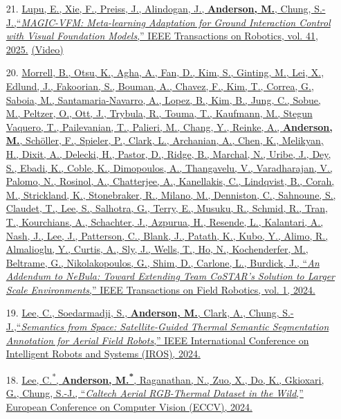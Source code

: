 \documentclass[12pt,letter,sans]{moderncv}
\begin{document}
\begin{itemize}

	\item [21.] \href{https://arxiv.org/pdf/2407.12304}
	{Lupu, E., Xie, F., Preiss, J., Alindogan, J.,  \underline{\textbf{Anderson, M.}}, Chung, S.-J.,``\textit{MAGIC-VFM: Meta-learning Adaptation for Ground Interaction Control with Visual Foundation Models},'' IEEE Transactions on Robotics, vol. 41, 2025.}
	\href{https://www.youtube.com/watch?v=sxM73ryweRA}{(Video)}

    \item [20.] \href{https://ieeexplore.ieee.org/document/10643435}
    {Morrell, B., Otsu, K., Agha, A., Fan, D., Kim, S., Ginting, M., Lei, X., Edlund, J., Fakoorian, S., Bouman, A., Chavez, F., Kim, T., Correa, G., Saboia, M., Santamaria-Navarro, A., Lopez, B., Kim, B., Jung, C., Sobue, M., Peltzer, O., Ott, J., Trybula, R., Touma, T., Kaufmann, M., Stegun Vaquero, T., Pailevanian, T., Palieri, M., Chang, Y., Reinke, A., \underline{\textbf{Anderson, M.}}, Sch\"{o}ller, F., Spieler, P., Clark, L., Archanian, A., Chen, K., Melikyan, H., Dixit, A., Delecki, H., Pastor, D., Ridge, B., Marchal, N., Uribe, J., Dey, S., Ebadi, K., Coble, K., Dimopoulos, A., Thangavelu, V., Varadharajan, V., Palomo, N., Rosinol, A., Chatterjee, A., Kanellakis, C., Lindqvist, B., Corah, M., Strickland, K., Stonebraker, R., Milano, M., Denniston, C., Sahnoune, S., Claudet, T., Lee, S., Salhotra, G., Terry, E., Musuku, R., Schmid, R., Tran, T., Kourchians, A., Schachter, J., Azpurua, H., Resende, L., Kalantari, A., Nash, J., Lee, J., Patterson, C., Blank, J., Patath, K., Kubo, Y., Alimo, R., Almalioglu, Y., Curtis, A., Sly, J., Wells, T., Ho, N., Kochenderfer, M., Beltrame, G., Nikolakopoulos, G., Shim, D., Carlone, L., Burdick, J., ``\textit{An Addendum to NeBula: Toward Extending Team CoSTAR's Solution to Larger Scale Environments},'' IEEE Transactions on Field Robotics, vol. 1, 2024.}
    
	\item [19.] \href{https://arxiv.org/pdf/2403.14056}
	{Lee, C., Soedarmadji, S.,  \underline{\textbf{Anderson, M.}}, Clark, A., Chung, S.-J.,``\textit{Semantics from Space: Satellite-Guided Thermal Semantic Segmentation Annotation for Aerial Field Robots},'' IEEE International Conference on Intelligent Robots and Systems (IROS), 2024.}

	\item [18.] \href{https://arxiv.org/pdf/2403.08997}
	{Lee, C.\textsuperscript{*}, \underline{\textbf{Anderson, M.\textsuperscript{*}}}, Raganathan, N., Zuo, X., Do, K., Gkioxari, G., Chung, S.-J., ``\textit{Caltech Aerial RGB-Thermal Dataset in the Wild},'' European Conference on Computer Vision (ECCV), 2024.}


\end{itemize}
\end{document}
